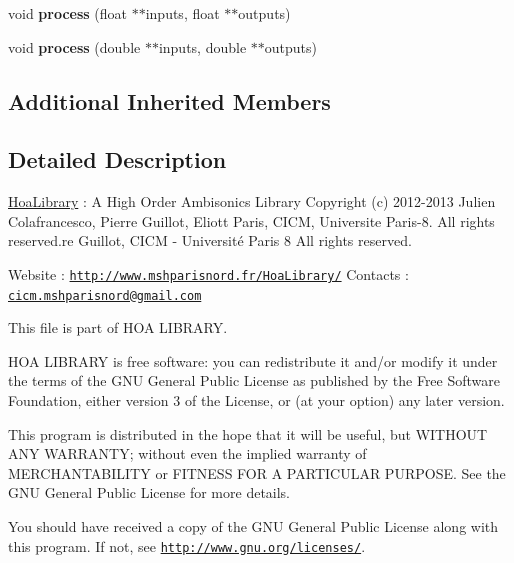 \begin{DoxyCompactItemize}
\item 
\hypertarget{class_ambisonics_filter_a9b73f86d05ba949a47faeddf89800e9c}{void {\bfseries process} (float $\ast$$\ast$inputs, float $\ast$$\ast$outputs)}\label{class_ambisonics_filter_a9b73f86d05ba949a47faeddf89800e9c}

\item 
\hypertarget{class_ambisonics_filter_a1a9abff888e189929ba9ea345adf66ba}{void {\bfseries process} (double $\ast$$\ast$inputs, double $\ast$$\ast$outputs)}\label{class_ambisonics_filter_a1a9abff888e189929ba9ea345adf66ba}

\end{DoxyCompactItemize}
\subsection*{Additional Inherited Members}


\subsection{Detailed Description}
\hyperlink{interface_hoa_library}{Hoa\-Library} \-: A High Order Ambisonics Library Copyright (c) 2012-\/2013 Julien Colafrancesco, Pierre Guillot, Eliott Paris, C\-I\-C\-M, Universite Paris-\/8. All rights reserved.\-re Guillot, C\-I\-C\-M -\/ Université Paris 8 All rights reserved.

Website \-: \href{http://www.mshparisnord.fr/HoaLibrary/}{\tt http\-://www.\-mshparisnord.\-fr/\-Hoa\-Library/} Contacts \-: \href{mailto:cicm.mshparisnord@gmail.com}{\tt cicm.\-mshparisnord@gmail.\-com}

This file is part of H\-O\-A L\-I\-B\-R\-A\-R\-Y.

H\-O\-A L\-I\-B\-R\-A\-R\-Y is free software\-: you can redistribute it and/or modify it under the terms of the G\-N\-U General Public License as published by the Free Software Foundation, either version 3 of the License, or (at your option) any later version.

This program is distributed in the hope that it will be useful, but W\-I\-T\-H\-O\-U\-T A\-N\-Y W\-A\-R\-R\-A\-N\-T\-Y; without even the implied warranty of M\-E\-R\-C\-H\-A\-N\-T\-A\-B\-I\-L\-I\-T\-Y or F\-I\-T\-N\-E\-S\-S F\-O\-R A P\-A\-R\-T\-I\-C\-U\-L\-A\-R P\-U\-R\-P\-O\-S\-E. See the G\-N\-U General Public License for more details.

You should have received a copy of the G\-N\-U General Public License along with this program. If not, see \href{http://www.gnu.org/licenses/}{\tt http\-://www.\-gnu.\-org/licenses/}. 

